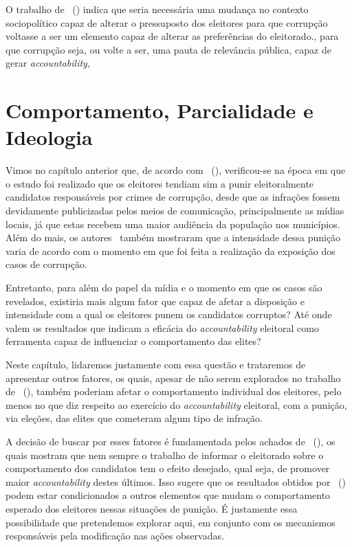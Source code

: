 \documentclass[
	12pt,				%
	openright,			%
	twoside,			%
	a4paper,			%
	openany,
	english,			%
	brazil				%
	]{abntex2}
\begin{document}
O trabalho de ~(\cite{Pavao2018Jul}) indica que seria necessária uma mudança no contexto sociopolítico capaz de alterar o pressuposto dos eleitores para que corrupção voltasse a ser um elemento capaz de alterar as preferências do eleitorado., para que corrupção seja, ou volte a ser, uma pauta de relevância pública, capaz de gerar \textit{accountability}, 


\chapter{Comportamento, Parcialidade e Ideologia}\label{cap_trabalho_academico}


Vimos no capítulo anterior que, de acordo com ~(\citeyear{ferraz2008exposing}), verificou-se na época em que o estudo foi realizado que os eleitores tendiam sim a punir eleitoralmente candidatos responsáveis por crimes de corrupção, desde que as infrações fossem devidamente publicizadas pelos meios de comunicação, principalmente as mídias locais, já que estas recebem uma maior audiência da população nos municípios. Além do mais, os autores~\cite{ferraz2008exposing} também mostraram que a intensidade dessa punição varia de acordo com o momento em que foi feita a realização da exposição dos casos de corrupção.

Entretanto, para além do papel da mídia e o momento em que os casos são revelados, existiria mais algum fator que capaz de afetar a disposição e intensidade com a qual os eleitores punem os candidatos corruptos? Até onde valem os resultados que indicam a eficácia do \textit{accountability} eleitoral como ferramenta capaz de influenciar o comportamento das elites?

Neste capítulo, lidaremos justamente com essa questão e trataremos de apresentar outros fatores, os quais, apesar de não serem explorados no trabalho de ~(\citeyear{ferraz2008exposing}), também poderiam afetar o comportamento individual dos eleitores, pelo menos no que diz respeito ao exercício do \textit{accountability} eleitoral, com a punição, via eleções, das elites que cometeram algum tipo de infração.

A decisão de buscar por esses fatores é fundamentada pelos achados de ~(\citeyear{dunning2019voter}), os quais mostram que nem sempre o trabalho de informar o eleitorado sobre o comportamento dos candidatos tem o efeito desejado, qual seja, de promover maior \textit{accountability} destes últimos. Isso sugere que os resultados obtidos por ~(\citeyear{ferraz2008exposing}) podem estar condicionados a outros elementos que mudam o comportamento esperado dos eleitores nessas situações de punição. É justamente essa possibilidade que pretendemos explorar aqui, em conjunto com os mecanismos responsáveis pela modificação nas ações observadas.
\end{document}
